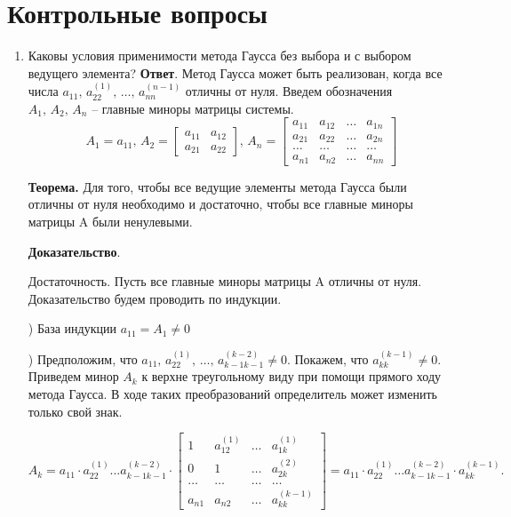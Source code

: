 \documentclass{article}
\begin{document}
\section{Контрольные вопросы}
\begin{enumerate}
    \item Каковы условия применимости метода Гаусса без выбора
    и с выбором ведущего элемента?
    \newline
    {\bfseries Ответ}.
    Метод Гаусса может быть реализован, когда все числа $a_{11},\, a_{22}^{(1)},\, \ldots,\, a_{nn}^{(n-1)}$ отличны от нуля. Введем обозначения $A_1, \, A_2,\, A_n$ -- главные миноры матрицы системы.
	\[
	A_1 = a_{11}, \, A_2 = \begin{bmatrix}
		a_{11} & a_{12}\\
		a_{21} & a_{22}
	\end{bmatrix}, \, A_n = \begin{bmatrix}
	a_{11} & a_{12} & \ldots & a_{1n}\\
	a_{21} & a_{22} & \ldots & a_{2n}\\
	\ldots & \ldots & \ldots & \ldots\\
	a_{n1} & a_{n2} & \ldots & a_{nn} 
	\end{bmatrix}
	\]
	
	
	\textbf{Теорема.} Для того, чтобы все ведущие элементы метода Гаусса были отличны от нуля необходимо и достаточно, чтобы все главные миноры матрицы A были ненулевыми.
	
	
	\textbf{Доказательство}.
	
	
	Достаточность. Пусть все главные миноры матрицы A отличны от нуля. Доказательство будем проводить по индукции.
	
	
	) База индукции $a_{11} = A_1 \neq 0 $
	
	
	) Предположим, что $a_{11},\, a_{22}^{(1)},\, \ldots, \, a_{k-1 k-1} ^ {(k-2)} \neq 0$. Покажем, что $a_{k k} ^ {(k-1)} \neq 0$. Приведем минор $A_k$ к верхне треугольному виду при помощи прямого ходу метода Гаусса. В ходе таких преобразований определитель может изменить только свой знак.
	
	\begin{equation}
		\label{minor}
		A_k = a_{11} \cdot a_{22}^{(1)} \ldots a_{k-1 k-1} ^ {(k-2)} \cdot \begin{bmatrix}
			1 & a_{12}^{(1)} & \ldots & a_{1k}^{(1)}\\
			0 & 1 & \ldots & a_{2k}^{(2)}\\
			\ldots & \ldots & \ldots & \ldots\\
			a_{n1} & a_{n2} & \ldots & a_{kk}^{(k-1)} 
		\end{bmatrix} = a_{11} \cdot a_{22}^{(1)} \ldots a_{k-1 k-1} ^ {(k-2)} \cdot a_{kk}^{(k-1)}.
	\end{equation}


\end{enumerate}
\end{document}
